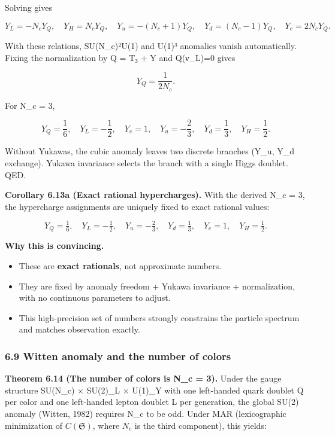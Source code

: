 Solving gives

\[
Y_L = -N_c Y_Q,\quad
Y_H = N_c Y_Q,\quad
Y_u = -(N_c + 1) Y_Q,\quad
Y_d = (N_c - 1) Y_Q,\quad
Y_e = 2 N_c Y_Q.
\]

With these relations, SU(N\_c)²U(1) and U(1)³ anomalies vanish automatically. Fixing the normalization by Q = T₃ + Y and Q(ν\_L)=0 gives

\[
Y_Q = \frac{1}{2 N_c}.
\]

For N\_c = 3,

\[
Y_Q = \frac{1}{6},\quad Y_L = -\frac{1}{2},\quad Y_e = 1,\quad
Y_u = -\frac{2}{3},\quad Y_d = \frac{1}{3},\quad Y_H = \frac{1}{2}.
\]

Without Yukawas, the cubic anomaly leaves two discrete branches (Y\_u, Y\_d exchange). Yukawa invariance selects the branch with a single Higgs doublet. QED.

\textbf{Corollary 6.13a (Exact rational hypercharges).} With the derived N\_c = 3, the hypercharge assignments are uniquely fixed to exact rational values:

\[
Y_Q = \tfrac{1}{6}, \quad
Y_L = -\tfrac{1}{2}, \quad
Y_u = -\tfrac{2}{3}, \quad
Y_d = \tfrac{1}{3}, \quad
Y_e = 1, \quad
Y_H = \tfrac{1}{2}.
\]

\textbf{Why this is convincing.}

\begin{itemize}
\tightlist
\item
  These are \textbf{exact rationals}, not approximate numbers.
\item
  They are fixed by anomaly freedom + Yukawa invariance + normalization, with no continuous parameters to adjust.
\item
  This high-precision set of numbers strongly constrains the particle spectrum and matches observation exactly.
\end{itemize}

\subsubsection{6.9 Witten anomaly and the number of colors}\label{69-witten-anomaly-and-the-number-of-colors}

\textbf{Theorem 6.14 (The number of colors is N\_c = 3).} Under the gauge structure SU(N\_c) × SU(2)\_L × U(1)\_Y with one left-handed quark doublet Q per color and one left-handed lepton doublet L per generation, the global SU(2) anomaly (Witten, 1982) requires N\_c to be odd. Under MAR (lexicographic minimization of \(C(\mathfrak S)\), where \(N_c\) is the third component), this yields:

